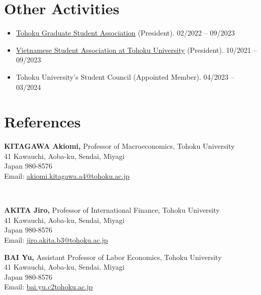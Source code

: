 \documentclass[margin,line]{res}
\begin{document}
\begin{resume}
\section{\sc Other Activities}
\begin{itemize}
\item[] \href{https://inseikaitohoku.org/}{Tohoku Graduate Student Association} (President).  \hfill 02/2022 -- 09/2023
\item[] \href{https://vsatohoku.wordpress.com/}{Vietnamese Student Association at Tohoku University} (President).  \hfill 10/2021 -- 09/2023
\item[] Tohoku University's Student Council (Appointed Member). \hfill 04/2023 -- 03/2024
\end{itemize}


\section{\sc References}
\vspace*{.05in}
\parbox{\textwidth}{
{\bf KITAGAWA Akiomi,} Professor of Macroeconomics, Tohoku University \\
41 Kawauchi, Aoba-ku, Sendai, Miyagi \\
Japan 980-8576 \\
Email: \href{mailto:akiomi.kitagawa.a4@tohoku.ac.jp}{akiomi.kitagawa.a4@tohoku.ac.jp}} \\

\par
\parbox{\textwidth}{
{\bf AKITA Jiro,} Professor of International Finance, Tohoku University\\
41 Kawauchi, Aoba-ku, Sendai, Miyagi \\
Japan 980-8576 \\
Email: \href{mailto:jiro.akita.b3@tohoku.ac.jp}{jiro.akita.b3@tohoku.ac.jp}}

\par
\parbox{\textwidth}{
{\bf BAI Yu,} Assistant Professor of Labor Economics, Tohoku University\\
41 Kawauchi, Aoba-ku, Sendai, Miyagi \\
Japan 980-8576 \\
Email: \href{mailto:bai.yu.c2tohoku.ac.jp}{bai.yu.c2tohoku.ac.jp}}


\end{resume}
\end{document}
